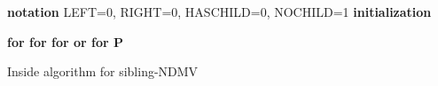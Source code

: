 \documentclass[11pt]{article}
\begin{document}
\begin{algorithm}[t]
 \footnotesize
\SetAlgoLined
\textbf{notation} LEFT=0, RIGHT=0, HASCHILD=0, NOCHILD=1 \newline
 \textbf{initialization}
  
  
  
   \newline
\bfseries{for}  \newline
 \hspace*{1em} \bfseries{for} \newline
 \hspace*{2em}  \newline
 \hspace*{2em} \bfseries{for}  \bfseries{or}   \newline
 \hspace*{3em}  \newline
  \hspace*{3em}  \newline
   \hspace*{3em}  \newline
  \hspace*{3em}  \newline
     \hspace*{3em}  \newline
     \hspace*{3em}  \newline
     \hspace*{3em}  \newline
  \hspace*{3em}  \newline
\bfseries{for}  \newline
\hspace*{1em}  \newline
 \newline
\Return P
 \caption{Inside algorithm for sibling-NDMV} 
 \label{eisner sibling}
\end{algorithm}
\end{document}

